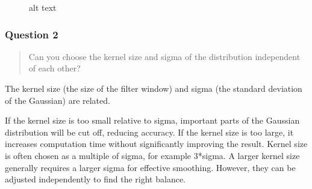 \documentclass[11pt]{article}
\begin{document}
    \begin{figure}
\centering
{}
\caption{alt text}
\end{figure}

    \subsubsection{Question 2}\label{question-2}

\begin{quote}
Can you choose the kernel size and sigma of the distribution independent
of each other?
\end{quote}

The kernel size (the size of the filter window) and sigma (the standard
deviation of the Gaussian) are related.

If the kernel size is too small relative to sigma, important parts of
the Gaussian distribution will be cut off, reducing accuracy. If the
kernel size is too large, it increases computation time without
significantly improving the result. Kernel size is often chosen as a
multiple of sigma, for example 3*sigma. A larger kernel size generally
requires a larger sigma for effective smoothing. However, they can be
adjusted independently to find the right balance.
\end{document}

